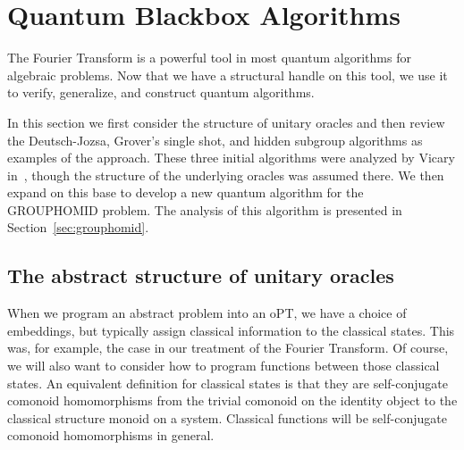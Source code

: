 \section{Quantum Blackbox Algorithms}
\label{sec:blackbox}
The Fourier Transform is a powerful tool in most quantum algorithms for algebraic problems. Now that we have a structural handle on this tool, we use it to verify, generalize, and construct quantum algorithms.

In this section we first consider the structure of unitary oracles and then review the Deutsch-Jozsa, Grover's single shot, and hidden subgroup algorithms as examples of the approach.  These three initial algorithms were analyzed by Vicary in~\cite{vicary-tqa}, though the structure of the underlying oracles was assumed there.  We then expand on this base to develop a new quantum algorithm for the GROUPHOMID problem. The analysis of this algorithm is presented in Section~\ref{sec:grouphomid}.

\subsection{The abstract structure of unitary oracles}
\label{sec:unitaryoracles}

When we program an abstract problem into an oPT, we have a choice of embeddings, but typically assign classical information to the classical states. This was, for example, the case in our treatment of the Fourier Transform. Of course, we will also want to consider how to program functions between those classical states. An equivalent definition for classical states is that they are self-conjugate comonoid homomorphisms from the trivial comonoid on the identity object to the classical structure monoid on a system. Classical functions will be self-conjugate comonoid homomorphisms in general.

